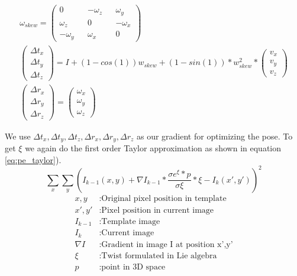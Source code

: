 \documentclass[11pt,a4paper,titlepage,oneside]{report}
\begin{document}
\begin{equation}\label{eq:pe_closed_form}
  \begin{gathered}
    \omega_{skew}=\begin{pmatrix}
      0 && -\omega_z && \omega_y \\
      \omega_z && 0 && -\omega_x \\
      -\omega_y && \omega_x && 0
    \end{pmatrix}\\
    \begin{pmatrix}
      \Delta t_x\\
      \Delta t_y\\
      \Delta t_z
    \end{pmatrix}=
    I+(1-cos(1))w_{skew}+(1-sin(1))*w_{skew}^2*\begin{pmatrix}
      v_x\\
      v_y\\
      v_z
    \end{pmatrix}\\
    \begin{pmatrix}
      \Delta r_x\\
      \Delta r_y\\
      \Delta r_z
    \end{pmatrix}=
    \begin{pmatrix}
      \omega_x\\
      \omega_y\\
      \omega_z
    \end{pmatrix}
  \end{gathered}
\end{equation}

We use $\Delta t_x,\Delta t_y,\Delta t_z,\Delta r_x,\Delta r_y,\Delta r_z$ as our gradient for optimizing the pose. To get $\xi$ we again do the first order Taylor approximation as shown in equation \ref{eq:pe_taylor}).
\begin{equation}\label{eq:pe_taylor}
  \sum_x\sum_y(I_{k-1}(x,y)+\nabla I_{k-1}*\frac{\sigma e^{\xi}*p}{\sigma \xi}*\xi-I_{k}(x',y'))^2
\end{equation}
\begin{align*}
  x,y        &: \text{Original pixel position in template}\\
  x',y'      &: \text{Pixel position in current image}\\
  I_{k-1}    &: \text{Template image}\\
  I_{k}      &: \text{Current image}\\
  \nabla I  &: \text{Gradient in image I at position x',y'}\\
  \xi        &: \text{Twist formulated in Lie algebra}\\
  p          &: \text{point in 3D space}  
\end{align*}
\end{document}
